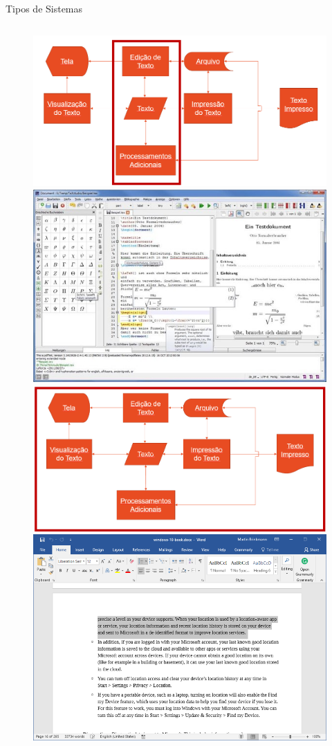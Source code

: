 \documentclass{beamer}
\begin{document}
\begin{frame}[shrink=10]{Tipos de Sistemas}
\begin{columns}
\begin{column}{0.5\textwidth}
\begin{figure}
\begin{overprint}
                        \includegraphics[width=0.8\linewidth]{Images/ide.png}
                        \includegraphics[width=0.8\linewidth]{Images/texstudio.jpg}    
                        \includegraphics[width=0.8\linewidth]{Images/processador.png}    
                        \includegraphics[width=0.8\linewidth]{Images/word.png}    

\end{overprint}
\end{figure}
\end{column}
\end{columns}
\end{frame}
\end{document}
